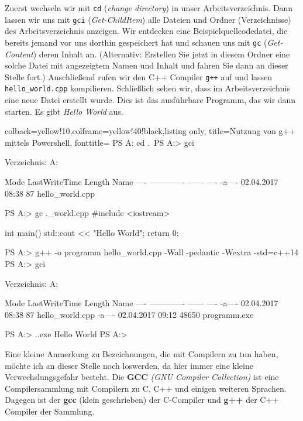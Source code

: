 \documentclass[a4paper]{report}
\begin{document}
Zuerst wechseln wir mit \texttt{cd} (\textit{change directory}) in unser Arbeitsverzeichnis. Dann lassen wir uns mit \texttt{gci} (\textit{Get-ChildItem}) alle Dateien und Ordner (Verzeichnisse) des Arbeitsverzeichnis anzeigen. Wir entdecken eine Beispielquellcodedatei, die bereits jemand vor uns dorthin gespeichert hat und schauen uns mit \texttt{gc} (\textit{Get-Content}) deren Inhalt an. (Alternativ: Erstellen Sie jetzt in diesem Ordner eine solche Datei mit angezeigtem Namen und Inhalt und fahren Sie dann an dieser Stelle fort.) Anschließend rufen wir den C++ Compiler \texttt{g++} auf und lassen \texttt{hello\_world.cpp} kompilieren. Schließlich sehen wir, dass im Arbeitsverzeichnis eine neue Datei erstellt wurde. Dies ist das ausführbare Programm, das wir dann starten. Es gibt \textit{Hello World} aus. 

\begin{center}
\begin{tcblisting}{colback=yellow!10,colframe=yellow!40!black,listing only,
		title=Nutzung von g++ mittels Powershell, fonttitle=\bfseries}
PS A:\> cd .\example\
PS A:\example> gci


Verzeichnis: A:\example


Mode                LastWriteTime         Length Name
----                -------------         ------ ----
-a----       02.04.2017     08:38             87 hello_world.cpp


PS A:\example> gc .\hello_world.cpp
#include <iostream>

int main(){
	std::cout << "Hello World";
	return 0;
}

PS A:\example> g++ -o programm hello_world.cpp -Wall -pedantic -Wextra -std=c++14
PS A:\example> gci


Verzeichnis: A:\example


Mode                LastWriteTime         Length Name
----                -------------         ------ ----
-a----       02.04.2017     08:38             87 hello_world.cpp
-a----       02.04.2017     09:12          48650 programm.exe


PS A:\example> .\programm.exe
Hello World
PS A:\example>
\end{tcblisting}
\end{center}


Eine kleine Anmerkung zu Bezeichnungen, die mit Compilern zu tun haben, möchte ich an dieser Stelle noch loswerden, da hier immer eine kleine Verwechslungsgefahr besteht. Die \textbf{GCC} \textit{(GNU Compiler Collection)} ist eine Compilersammlung mit Compilern zu C, C++ und einigen weiteren Sprachen. Dagegen ist der \textbf{gcc} (klein geschrieben) der C-Compiler und \textbf{g++} der C++ Compiler der Sammlung.
\medskip
\end{document}
